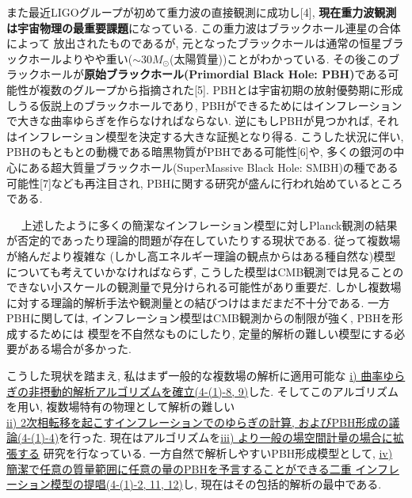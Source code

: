 \documentclass[11pt,a4paper,twoside]{jarticle}
\renewcommand{\emph}[1]{{\sffamily\gtfamily\bfseries #1}}
\newcommand{\subject}[1]{\noindent{\sffamily\gtfamily\bfseries #1}~~}
\newcommand{\研究課題名}{\mgfamily\sffamily インフレーション宇宙における曲率ゆらぎと原始ブラックホール形成}
\newcommand{\研究機関名}{\mgfamily\sffamily Institut d'Astrophysique de Paris}
\newcommand{\申請者氏名}{\mgfamily\sffamily 多田祐一郎}
\newcommand{\研究代表者氏名}{\申請者氏名}
\newcommand{\研究期間の最終元号年度}{32}	%
\begin{document}
{	また最近LIGOグループが初めて重力波の直接観測に成功し[4], \emph{現在重力波観測は宇宙物理の最重要課題}になっている.
	この重力波はブラックホール連星の合体によって
	放出されたものであるが, 元となったブラックホールは通常の恒星ブラックホールよりやや重い($\sim30M_\odot$(太陽質量))ことがわかっている.
	その後このブラックホールが\emph{原始ブラックホール(Primordial Black Hole: PBH)}である可能性が複数のグループから指摘された[5]. 
	PBHとは宇宙初期の放射優勢期に形成しうる仮説上のブラックホールであり, 
	PBHができるためにはインフレーションで大きな曲率ゆらぎを作らなければならない. 
	逆にもしPBHが見つかれば, それはインフレーション模型を決定する大きな証拠となり得る. 
	こうした状況に伴い, PBHのもともとの動機である暗黒物質がPBHである可能性[6]や,
	多くの銀河の中心にある超大質量ブラックホール(SuperMassive Black Hole: SMBH)の種である可能性[7]なども再注目され,
	PBHに関する研究が盛んに行われ始めているところである.
	
	
	\vspace{3pt}
	\subject{2. 問題点および解決方策}
	上述したように多くの簡潔なインフレーション模型に対しPlanck観測の結果が否定的であったり理論的問題が存在していたりする現状である. 
	従って複数場が絡んだより複雑な
	(しかし高エネルギー理論の観点からはある種自然な)模型についても考えていかなければならず,
	こうした模型はCMB観測では見ることのできない小スケールの観測量で見分けられる可能性があり重要だ.
	しかし複数場に対する理論的解析手法や観測量との結びつけはまだまだ不十分である.
	一方PBHに関しては, インフレーション模型はCMB観測からの制限が強く, PBHを形成するためには
	模型を不自然なものにしたり, 定量的解析の難しい模型にする必要がある場合が多かった.
	
	こうした現状を踏まえ, 私はまず一般的な複数場の解析に適用可能な
	{\mgfamily\sffamily \ul{i) 曲率ゆらぎの非摂動的解析アルゴリズムを確立(4-(1)-8, 9)}}した.
	そしてこのアルゴリズムを用い, 複数場特有の物理として解析の難しい\\
	{\mgfamily\sffamily \ul{ii) 2次相転移を起こすインフレーションでのゆらぎの計算, 
	およびPBH形成の議論(4-(1)-4)}}を行った. 現在はアルゴリズムを{\mgfamily\sffamily \ul{iii) より一般の場空間計量の場合に拡張する}}
	研究を行なっている.
	一方自然で解析しやすいPBH形成模型として, {\mgfamily\sffamily \ul{iv) 簡潔で任意の質量範囲に任意の量のPBHを予言することができる二重
	インフレーション模型の提唱(4-(1)-2, 11, 12)}}し, 現在はその包括的解析の最中である. 
	
}
\end{document}
